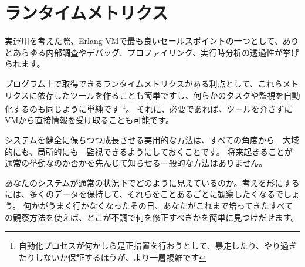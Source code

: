 \chapter{ランタイムメトリクス}
\label{chap:runtime-metrics}

実運用を考えた際、Erlang VMで最も良いセールスポイントの一つとして、ありとあらゆる内部調査やデバッグ、プロファイリング、実行時分析の透過性が挙げられます。

プログラム上で取得できるランタイムメトリクスがある利点として、これらメトリクスに依存したツールを作ることも簡単ですし、何らかのタスクや監視を自動化するのも同じように単純です
\footnote{自動化プロセスが何かしら是正措置を行おうとして、暴走したり、やり過ぎたりしないか保証するほうが、より一層複雑です}。
それに、必要であれば、ツールを介さずにVMから直接情報を受け取ることも可能です。

システムを健全に保ちつつ成長させる実用的な方法は、すべての角度から―大域的にも、局所的にも―監視できるようにしておくことです。
将来起きることが通常の挙動なのか否かを先んじて知らせる一般的な方法はありません。

あなたのシステムが通常の状況下でどのように見えているのか。考えを形にするには、多くのデータを保持して、それらをことあるごとに観察したくなるでしょう。
何かがうまく行かなくなったその日、あなたがこれまで培ってきたすべての観察方法を使えば、どこが不調で何を修正すべきかを簡単に見つけだせます。

